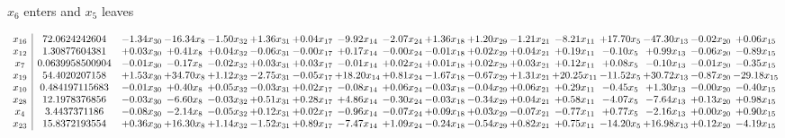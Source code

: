 \documentclass[9pt]{article}
\begin{document}
 $ x_{6} $ enters and $ x_{5} $ leaves 

 \[\begin{array}{c| c c@{\hskip 2pt} c@{\hskip 2pt} c@{\hskip 2pt} c@{\hskip 2pt} c@{\hskip 2pt} c@{\hskip 2pt} c@{\hskip 2pt} c@{\hskip 2pt} c@{\hskip 2pt} c@{\hskip 2pt} c@{\hskip 2pt} c@{\hskip 2pt} c@{\hskip 2pt} c@{\hskip 2pt} c@{\hskip 2pt} }
 x_{16}   &  72.0624242604 & -1.34 x_{30} & -16.34 x_{8} & -1.50 x_{32} & +  1.36 x_{31} & +  0.04 x_{17} & -9.92 x_{14} & -2.07 x_{24} & +  1.36 x_{18} & +  1.20 x_{29} & -1.21 x_{21} & -8.21 x_{11} & + 17.70 x_{5} & -47.30 x_{13} & -0.02 x_{20} & +  0.06 x_{15}\\
 x_{12}   &  1.30877604381 & +  0.03 x_{30} & +  0.41 x_{8} & +  0.04 x_{32} & -0.06 x_{31} & -0.00 x_{17} & +  0.17 x_{14} & -0.00 x_{24} & -0.01 x_{18} & +  0.02 x_{29} & +  0.04 x_{21} & +  0.19 x_{11} & -0.10 x_{5} & +  0.99 x_{13} & -0.06 x_{20} & -0.89 x_{15}\\
 x_{7}   &  0.0639958500904 & -0.01 x_{30} & -0.17 x_{8} & -0.02 x_{32} & +  0.03 x_{31} & +  0.03 x_{17} & -0.01 x_{14} & +  0.02 x_{24} & +  0.01 x_{18} & +  0.02 x_{29} & +  0.03 x_{21} & +  0.12 x_{11} & +  0.08 x_{5} & -0.10 x_{13} & -0.01 x_{20} & -0.35 x_{15}\\
 x_{19}   &  54.4020207158 & +  1.53 x_{30} & + 34.70 x_{8} & +  1.12 x_{32} & -2.75 x_{31} & -0.05 x_{17} & + 18.20 x_{14} & +  0.81 x_{24} & -1.67 x_{18} & -0.67 x_{29} & +  1.31 x_{21} & + 20.25 x_{11} & -11.52 x_{5} & + 30.72 x_{13} & -0.87 x_{20} & -29.18 x_{15}\\
 x_{10}   &  0.484197115683 & -0.01 x_{30} & +  0.40 x_{8} & +  0.05 x_{32} & -0.03 x_{31} & +  0.02 x_{17} & -0.08 x_{14} & +  0.06 x_{24} & -0.03 x_{18} & -0.04 x_{29} & +  0.06 x_{21} & +  0.29 x_{11} & -0.45 x_{5} & +  1.30 x_{13} & -0.00 x_{20} & -0.40 x_{15}\\
 x_{28}   &  12.1978376856 & -0.03 x_{30} & -6.60 x_{8} & -0.03 x_{32} & +  0.51 x_{31} & +  0.28 x_{17} & +  4.86 x_{14} & -0.30 x_{24} & -0.03 x_{18} & -0.34 x_{29} & +  0.04 x_{21} & +  0.58 x_{11} & -4.07 x_{5} & -7.64 x_{13} & +  0.13 x_{20} & +  0.98 x_{15}\\
 x_{4}   &  3.4437371186 & -0.08 x_{30} & -2.14 x_{8} & -0.05 x_{32} & +  0.12 x_{31} & +  0.02 x_{17} & -0.96 x_{14} & -0.07 x_{24} & +  0.09 x_{18} & +  0.03 x_{29} & -0.07 x_{21} & -0.77 x_{11} & +  0.77 x_{5} & -2.16 x_{13} & +  0.00 x_{20} & +  0.90 x_{15}\\
 x_{23}   &  15.8372193554 & +  0.36 x_{30} & + 16.30 x_{8} & +  1.14 x_{32} & -1.52 x_{31} & +  0.89 x_{17} & -7.47 x_{14} & +  1.09 x_{24} & -0.24 x_{18} & -0.54 x_{29} & +  0.82 x_{21} & +  0.75 x_{11} & -14.20 x_{5} & + 16.98 x_{13} & +  0.12 x_{20} & -4.19 x_{15}\\

\end{array}\]
\end{document}
